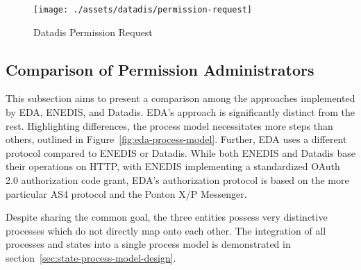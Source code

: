 \begin{figure}[h]
    \centering \texttt{[image: ./assets/datadis/permission-request]}
    \caption{Datadis Permission Request}
    \label{fig:datadis-permission-request}
\end{figure}

\subsection{Comparison of Permission Administrators}\label{subsec:comparison-of-permission-administrators}
This subsection aims to present a comparison among the approaches implemented by EDA, ENEDIS, and Datadis.
EDA's approach is significantly distinct from the rest.
Highlighting differences, the process model necessitates more steps than others,
outlined in Figure\ \ref{fig:eda-process-model}.
Further, EDA uses a different protocol compared to ENEDIS or Datadis.
While both ENEDIS and Datadis base their operations on HTTP,
with ENEDIS implementing a standardized OAuth 2.0 authorization code grant,
EDA's authorization protocol is based on the more particular AS4 protocol and the Ponton X/P Messenger.

Despite sharing the common goal,
the three entities possess very distinctive processes which do not directly map onto each other.
The integration of all processes and states into a single process model is demonstrated in section\ \ref{sec:state-process-model-design}.